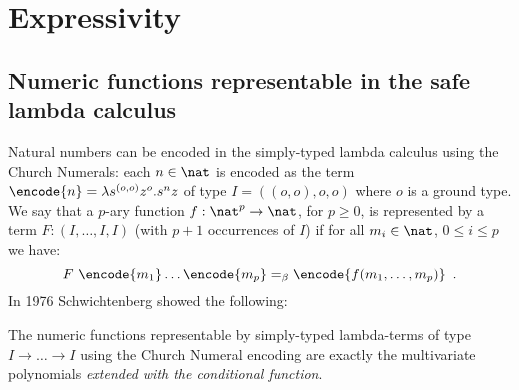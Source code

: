 \allowdisplaybreaks

\section{Expressivity}
\label{sec:expressivity}
\subsection{Numeric functions representable in the safe lambda
calculus}

Natural numbers can be encoded in the simply-typed lambda calculus
using the Church Numerals: each $n\in\nat$ is encoded as the term
$\encode{n} = \lambda s^{(o,o)} z^o. s^n z$ of type $I = ((o,o),o,o)$ where
$o$ is a ground type.
We say that a $p$-ary function $f : \nat^p \rightarrow \nat$, for $p \geq 0$,
is represented by a term $F : (I, \ldots, I, I)$ (with $p+1$ occurrences of $I$)
if for all $m_i \in \nat$, $0\leq i\leq p$ we have:
$$F~\encode{m_1} \ldots \encode{m_p} =_\beta \encode{f(m_1,\ldots, m_p)} \enspace .$$
In 1976 Schwichtenberg \cite{citeulike:622637}
showed the following:


\begin{theorem}[Schwichtenberg 1976]
The numeric functions representable by simply-typed lambda-terms
of type $I\rightarrow \ldots \rightarrow I$ using the Church Numeral
encoding are exactly the multivariate polynomials \emph{extended
with the conditional function}.
\end{theorem}

